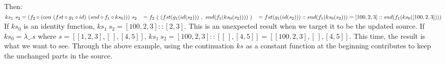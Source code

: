 Then: $ks_1 \ s_2 = (f_2 \circ (con \ (fst \circ g_1 \circ id) \ (snd \circ f_1 \circ ks_0))) \ s_2 \\
\hspace*{3mm} = f_2 \ (\ (fst(g_1(id(s_2))) \ , \ snd(f_1(ks_0(s_2))))\ )\\
\hspace*{3mm} = fst(g_1(id(s_2))) :: snd(f_1(ks_0(s_2))) = [100,2,3] :: snd(f_1(ks_0([100,2,3])))$\\
If $ks_0$ is an identity function, $ks_1 \ s_2 = [100,2,3] :: [2,3]$. This is an unexpected result when we target it to be the updated source. If $ks_0 = \lambda \_.s$ where $s = [[1,2,3], [\,], [4,5]]$, $ks_1 \ s_2 = [100,2,3] :: [[\,], [4,5]] = [[100,2,3], [\,], [4,5]]$. This time, the result is what we want to see. Through the above example, using the continuation $ks$ as a constant function at the beginning contributes to keep the unchanged parts in the source.